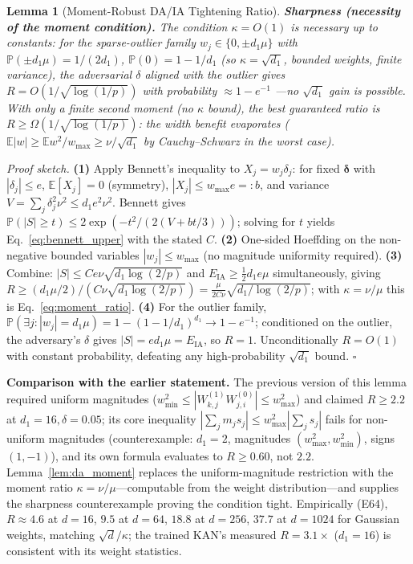 \documentclass[journal,onecolumn]{IEEEtran}
\newtheorem{lemma}{Lemma}
\begin{document}
\begin{lemma}[Moment-Robust DA/IA Tightening Ratio]
\noindent\textbf{Sharpness (necessity of the moment condition).}
The condition $\kappa = O(1)$ is \emph{necessary} up to constants: for
the sparse-outlier family $w_j \in \{0, \pm d_1 \mu\}$ with
$\mathbb{P}(\pm d_1\mu) = 1/(2d_1)$, $\mathbb{P}(0) = 1 - 1/d_1$
(so $\kappa = \sqrt{d_1}$, bounded weights, finite variance), the
adversarial $\delta$ aligned with the outlier gives
$R = O(1/\sqrt{\log(1/p)})$ with probability $\approx 1 - e^{-1}$
---no $\sqrt{d_1}$ gain is possible. With only a finite second moment
(no $\kappa$ bound), the best guaranteed ratio is
$R \geq \Omega(1/\sqrt{\log(1/p)})$: the width benefit evaporates
($\mathbb{E}|w| \geq \mathbb{E}w^2/w_{\max} \geq \nu/\sqrt{d_1}$
by Cauchy--Schwarz in the worst case).
\end{lemma}

\vspace{2pt}
\noindent\textit{Proof sketch.}
\textbf{(1)} Apply Bennett's inequality to $X_j = w_j \delta_j$: for
fixed $\boldsymbol{\delta}$ with $|\delta_j| \leq e$,
$\mathbb{E}[X_j] = 0$ (symmetry), $|X_j| \leq w_{\max} e =: b$, and
variance $V = \sum_j \delta_j^2 \nu^2 \leq d_1 e^2 \nu^2$. Bennett
gives $\mathbb{P}(|S| \geq t) \leq 2\exp(-t^2 / (2(V + bt/3)))$;
solving for $t$ yields Eq.~\eqref{eq:bennett_upper} with the stated
$C$. \textbf{(2)} One-sided Hoeffding on the non-negative bounded
variables $|w_j| \leq w_{\max}$ (no magnitude uniformity required).
\textbf{(3)} Combine: $|S| \leq C e \nu \sqrt{d_1 \log(2/p)}$ and
$E_{\text{IA}} \geq \tfrac{1}{2} d_1 e \mu$ simultaneously, giving
$R \geq (d_1 \mu / 2) / (C \nu \sqrt{d_1 \log(2/p)})
= \tfrac{\mu}{2C\nu} \sqrt{d_1/\log(2/p)}$; with $\kappa = \nu/\mu$
this is Eq.~\eqref{eq:moment_ratio}. \textbf{(4)} For the outlier
family, $\mathbb{P}(\exists j: |w_j| = d_1\mu) = 1 - (1-1/d_1)^{d_1}
\to 1 - e^{-1}$; conditioned on the outlier, the adversary's
$\delta$ gives $|S| = e d_1 \mu = E_{\text{IA}}$, so $R = 1$.
Unconditionally $R = O(1)$ with constant probability, defeating any
high-probability $\sqrt{d_1}$ bound. $\square$

\vspace{2pt}
\noindent\textbf{Comparison with the earlier statement.} The previous
version of this lemma required uniform magnitudes
($w_{\min}^2 \leq |W_{k,j}^{(1)}W_{j,i}^{(0)}| \leq w_{\max}^2$) and
claimed $R \geq 2.2$ at $d_1=16, \delta=0.05$; its core inequality
$|\sum_j m_j s_j| \leq w_{\max}^2 |\sum_j s_j|$ fails for non-uniform
magnitudes (counterexample: $d_1=2$, magnitudes $(w_{\max}^2,
w_{\min}^2)$, signs $(1,-1)$), and its own formula evaluates to
$R \geq 0.60$, not $2.2$. Lemma~\ref{lem:da_moment} replaces the
uniform-magnitude restriction with the moment ratio
$\kappa = \nu/\mu$---computable from the weight distribution---and
supplies the sharpness counterexample proving the condition tight.
Empirically (E64), $R \approx 4.6$ at $d=16$, $9.5$ at $d=64$,
$18.8$ at $d=256$, $37.7$ at $d=1024$ for Gaussian weights,
matching $\sqrt{d}/\kappa$; the trained KAN's measured $R = 3.1\times$
($d_1 = 16$) is consistent with its weight statistics.
\end{document}

